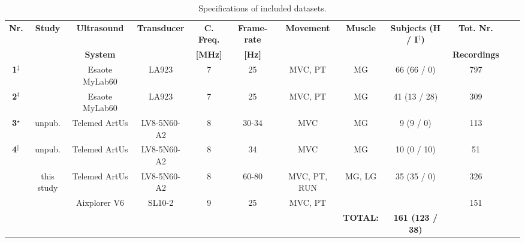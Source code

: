 \documentclass[journal,twoside,web]{ieeecolor}
\begin{document}
\begin{table*}[ht!]
    \caption{Specifications of included datasets.}
    \label{tab:studies}
    \setlength{\tabcolsep}{3pt} \begin{center}
    \begin{tabular}{cccccccccccc}
        \toprule
        \multirow{2}{*}{\textbf{Nr.}}
        &\multirow{2}{*}{\textbf{Study}}
        &\textbf{Ultrasound}
        &\multirow{2}{*}{\textbf{Transducer}}
        &\textbf{C. Freq.}
        &\textbf{Frame-rate}
        &\multirow{2}{*}{\textbf{Movement}}
        &\multirow{2}{*}{\textbf{Muscle}}
        &\multirow{2}{*}{\textbf{Subjects (H / I$^\dagger$)}}
        &\textbf{Tot. Nr.}\\
&
        &\textbf{System}
        &
        &\textbf{[MHz]}
        &\textbf{[Hz]}
        &
        &
        &
        &\textbf{Recordings}\\
\midrule
        \rule{0pt}{12pt}
        \textbf{1$^{\ddagger}$}
        &\cite{j:Konrad2014:1,j:Konrad2015,j:Konrad2014:2} 
        &Esaote MyLab60 
        &LA923
        &7
        &25
        &MVC, PT  
        &MG 
        &66 (66 / 0)
        &797\\
\rule{0pt}{12pt}
        \textbf{2$^{\ddagger}$}
        &\cite{j:Kruse2017,j:Kruse2018,j:Kruse2019}
        &Esaote MyLab60
        &LA923
        &7 
        &25
        &MVC, PT
        &MG
        &41 (13 / 28)
        &309\\
\rule{0pt}{12pt}
        \textbf{3$^\star$}
        &unpub.
        &Telemed ArtUs
        &LV8-5N60-A2
        &8 
        &30-34
        &MVC
        &MG
        &9 (9 / 0)
        &113\\
\rule{0pt}{12pt}
        \textbf{4$^\|$}
        &unpub.
        &Telemed ArtUs
        &LV8-5N60-A2
        &8 
        &34
        &MVC
        &MG
        &10 (0 / 10)
        &51\\
\rule{0pt}{12pt}
        \multirow{2}{*}{\textbf{5$^\mathsection$}}
        &\multirow{2}{*}{this study}  
        &Telemed ArtUs
        &LV8-5N60-A2
        &8
        &60-80
        &MVC, PT, RUN
        &\multirow{2}{*}{MG, LG}
        &\multirow{2}{*}{35 (35 / 0)}
        &326\\ 
&
        &Aixplorer V6
        &SL10-2
        &9
        &25
        &MVC, PT
        &
        &
        &151\\ 
        \bottomrule
        \addlinespace[4pt]
&
        &
        &
        &
        &
        &
        &\textbf{\small TOTAL:}
        &\textbf{\small 161 (123 / 38)}

\end{tabular}
\end{center}
\end{table*}
\end{document}
